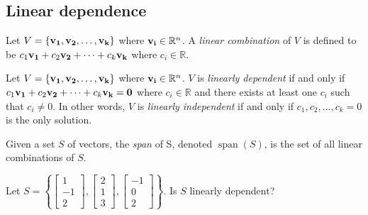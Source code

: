 \documentclass[../main.tex]{subfiles}
\begin{document}
\subsection{Linear dependence}

\begin{definition}
	Let $V=\{ \mathbf{v_1}, \mathbf{v_2}, \ldots , \mathbf{v_k} \}$ where $\mathbf{v_i} \in \mathbb{R}^n$.
	A \textit{linear combination} of $V$ is defined to be
	$c_1\mathbf{v_1} + c_2\mathbf{v_2} + \dots + c_k\mathbf{v_k}$ where $c_i \in \mathbb{R}$.
\end{definition}

\begin{definition}
	Let $V=\{ \mathbf{v_1}, \mathbf{v_2}, \ldots , \mathbf{v_k} \}$ where $\mathbf{v_i} \in \mathbb{R}^n$.
	$V$ is \textit{linearly dependent} if and only if
	$c_1\mathbf{v_1} + c_2\mathbf{v_2} + \dots + c_k\mathbf{v_k} = \mathbf{0}$
	where $c_i \in \mathbb{R}$ and there exists at least one $c_i$
	such that $c_i \neq 0$. In other words, $V$ is \textit{linearly independent}
	if and only if $c_1,c_2,\ldots ,c_k=0$ is the only solution.
\end{definition}

\begin{definition}[Span]
	Given a set $S$ of vectors, the \textit{span} of S,
	denoted $\operatorname{span}(S)$, is the set of all linear combinations of $S$.
\end{definition}

\begin{example}
	Let $S=\left\{
		\begin{bmatrix} 1 \\ -1 \\ 2 \end{bmatrix},
		\begin{bmatrix} 2 \\ 1 \\ 3 \end{bmatrix},
		\begin{bmatrix} -1 \\ 0 \\ 2 \end{bmatrix}
		\right\}$. Is $S$ linearly dependent?
\end{example}
\end{document}

